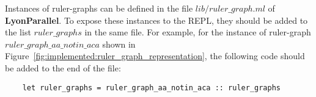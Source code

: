 Instances of ruler-graphs can be defined in the file \colorbox{Ivory2}{$lib/ruler\_graph.ml$} of \textbf{LyonParallel}. To expose these instances to the REPL, they should be added to the list \colorbox{Ivory2}{$ruler\_graphs$} in the same file. For example, for the instance of ruler-graph \colorbox{Ivory2}{$ruler\_graph\_aa\_notin\_aca$} shown in Figure~\ref{fig:implemented:ruler_graph_representation}, the following code should be added to the end of the file:
\begin{verbatim}
    let ruler_graphs = ruler_graph_aa_notin_aca :: ruler_graphs 
\end{verbatim}


 
